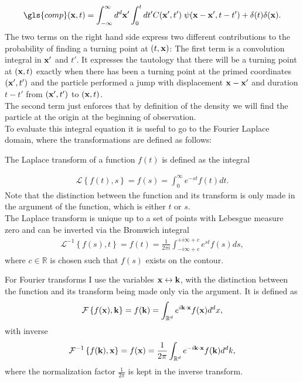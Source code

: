 \begin{align}
\gls{comp}(\ve{x},t) = \int_{-\infty}^{\infty} d^{d}\ve{x}' \int_{0}^{t} dt' C(\ve{x}',t')  \; \psi(\ve{x}-\ve{x}',t-t') + \delta(t) \delta(\ve{x}) . \label{eqn:CTransport}
\end{align}
%
The two terms on the right hand side express two different contributions to the probability of finding a turning point at $(t,\mathbf{ x })$: The first term is a convolution integral in $\mathbf{ x' }$ and $t'$. It expresses the tautology that there will be a turning point at $(\mathbf{ x },t)$ exactly when there has been a turning point at the primed coordinates $(\mathbf{ x' },t')$ and the particle performed a jump with displacement $\mathbf{ x }-\mathbf{ x }'$ and duration $t-t'$ from $(\mathbf{ x' },t')$ to $(\mathbf{ x },t)$.  \\
The second term just enforces that by definition of the density we will find the particle at the origin at the beginning of observation. \\
To evaluate this integral equation it is useful to go to the Fourier Laplace domain, where the transformations are defined as follows:

The Laplace transform of a function $f(t)$ is defined as the integral 

\begin{align}
\mathcal{L} \left\{ f(t), s \right\} = f(s) = \int^{\infty}_{0} e^{-st} f(t) dt .
\end{align}
%
Note that the distinction between the function and its transform is only made in the argument of the function, which is either $t$ or $s$. \\
The Laplace transform is unique up to a set of points with Lebesgue measure zero and can be inverted via the Bromwich integral 
%
\begin{align}
\mathcal{L}^{-1} \left\{ f(s), t \right\} = f(t) = \frac{1}{2 \pi i} \int^{+i \infty + c}_{-i \infty + c} e^{st} f(s) ds, 
\end{align}
%
where $c \in \mathbb{R}$ is chosen such that $f(s)$ exists on the contour. 

For Fourier transforms I use the variables $\mathbf{ x } \leftrightarrow \mathbf{ k }$, with the distinction between the function and its transform being made only via the argument. It is defined as 
%
\begin{align}
\mathcal{F} \left\{ f(\mathbf{ x }), \mathbf{ k } \right\} = f(\mathbf{ k }) = \int_{\mathbb{R}^{d}} e^{i\mathbf{ k } \cdot \mathbf{ x }} f(\mathbf{ x }) d^{d}x ,
\end{align}
%
with inverse 
%
\begin{align}
\mathcal{F}^{-1} \left\{ f(\mathbf{ k }), \mathbf{ x } \right\} = f(\mathbf{ x }) = \frac{1}{2 \pi} \int_{\mathbb{R}^{d}} e^{-i\mathbf{ k } \cdot \mathbf{ x }} f(\mathbf{ k }) d^{d}k ,
\end{align}
%
where the normalization factor $\frac{1}{2 \pi}$ is kept in the inverse transform.\\

